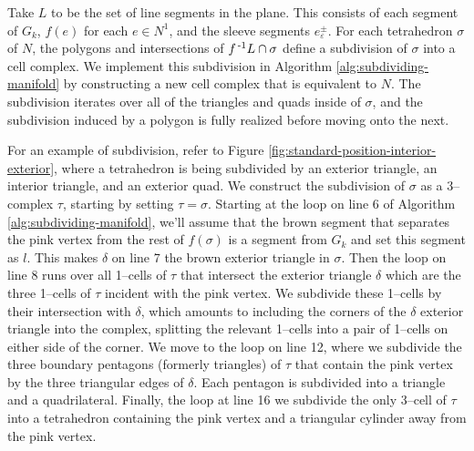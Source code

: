 %

Take $L$ to be the set of line segments in the plane.
This consists of each segment of $G_k$, $f(e)$ for each $e\in N^1$, and the sleeve segments $e_\varepsilon^\pm$.
For each tetrahedron $\sigma$ of $N$, the polygons and intersections of $f^{\,\text{-}1} L\cap\sigma$ define a subdivision of $\sigma$ into a cell complex.
We implement this subdivision in Algorithm \ref{alg:subdividing-manifold} by constructing a new cell complex that is equivalent to $N$.
The subdivision iterates over all of the triangles and quads inside of $\sigma$, and the subdivision induced by a polygon is fully realized before moving onto the next.

For an example of subdivision, refer to Figure \ref{fig:standard-position-interior-exterior}, where a tetrahedron is being subdivided by an exterior triangle, an interior triangle, and an exterior quad.
We construct the subdivision of $\sigma$ as a 3--complex $\tau$, starting by setting $\tau = \sigma$.
Starting at the loop on line 6 of Algorithm \ref{alg:subdividing-manifold}, we'll assume that the brown segment that separates the pink vertex from the rest of $f(\sigma)$ is a segment from $G_k$ and set this segment as $l$.
This makes $\delta$ on line 7 the brown exterior triangle in $\sigma$.
Then the loop on line 8 runs over all 1--cells of $\tau$ that intersect the exterior triangle $\delta$ which are the three 1--cells of $\tau$ incident with the pink vertex.
We subdivide these 1--cells by their intersection with $\delta$, which amounts to including the corners of the $\delta$ exterior triangle into the complex, splitting the relevant 1--cells into a pair of 1--cells on either side of the corner.
We move to the loop on line 12, where we subdivide the three boundary pentagons (formerly triangles) of $\tau$ that contain the pink vertex by the three triangular edges of $\delta$.
Each pentagon is subdivided into a triangle and a quadrilateral.
Finally, the loop at line 16 we subdivide the only 3--cell of $\tau$ into a tetrahedron containing the pink vertex and a triangular cylinder away from the pink vertex.

